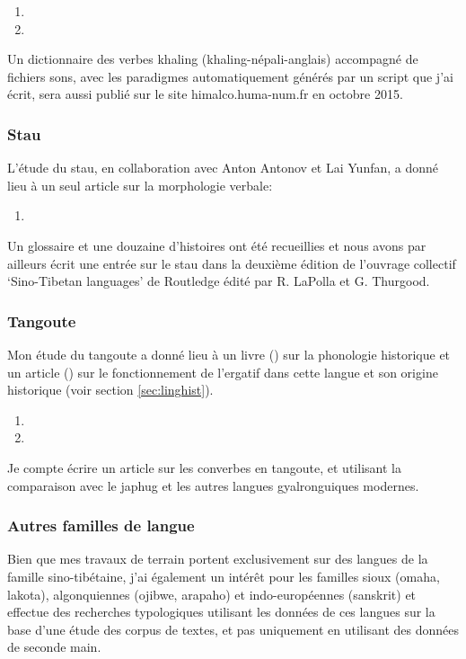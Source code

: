 \documentclass[oldfontcommands,oneside,a4paper,11pt]{article}
\begin{document}
\begin{enumerate}
\item {}
 \item  {}
\end{enumerate} 

Un dictionnaire des verbes khaling (khaling-népali-anglais) accompagné de fichiers sons, avec les paradigmes automatiquement générés par un script que j'ai écrit, sera aussi publié sur le site  himalco.huma-num.fr en octobre 2015.

\subsubsection{Stau}
L'étude du stau, en collaboration avec Anton Antonov et Lai Yunfan, a donné lieu à un seul article sur la morphologie verbale:

\begin{enumerate}
\item {}
\end{enumerate} 

Un glossaire et une douzaine d'histoires ont été recueillies et nous avons par ailleurs écrit une entrée sur le stau dans la deuxième édition de l'ouvrage collectif `Sino-Tibetan languages' de Routledge édité par R. LaPolla et G. Thurgood.

\subsubsection{Tangoute}
Mon étude du tangoute a donné lieu à un livre (\citealt{jacques14esquisse}) sur la phonologie historique et un article (\citealt{jacques14ergative}) sur le fonctionnement de l'ergatif dans cette langue et son origine historique (voir section \ref{sec:linghist}).

\begin{enumerate}
 \item  {}
 \item {}
\end{enumerate} 

Je compte écrire un article sur les converbes en tangoute, et utilisant la comparaison avec le japhug et les autres langues gyalronguiques modernes.

\subsubsection{Autres familles de langue}
Bien que mes travaux de terrain portent exclusivement sur des langues de la famille sino-tibétaine, j'ai également un intérêt pour les familles sioux (omaha, lakota), algonquiennes (ojibwe, arapaho) et indo-européennes (sanskrit)  et effectue des recherches typologiques utilisant les données de ces langues sur la base d'une étude des corpus de textes, et pas uniquement en utilisant des données de seconde main.
\end{document}
